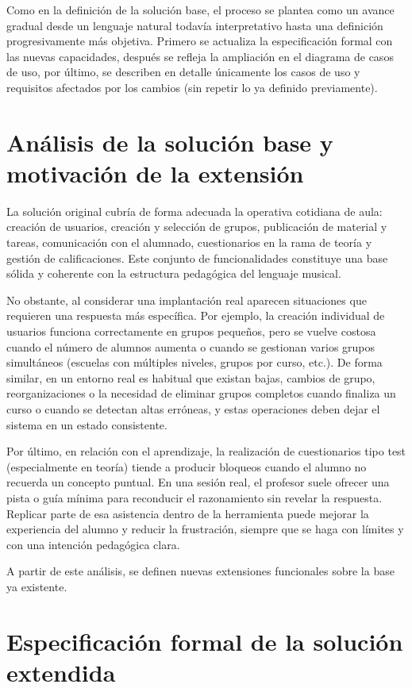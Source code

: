Como en la definición de la solución base, el proceso se plantea como un avance gradual desde un lenguaje natural todavía interpretativo hasta una definición progresivamente más objetiva. Primero se actualiza la especificación formal con las nuevas capacidades, después se refleja la ampliación en el diagrama de casos de uso, por último, se describen en detalle únicamente los casos de uso y requisitos afectados por los cambios (sin repetir lo ya definido previamente).
\newpage
\section{Análisis de la solución base y motivación de la extensión}
\label{sec:analisis_base}

La solución original cubría de forma adecuada la operativa cotidiana de aula: creación de usuarios, creación y selección de grupos, publicación de material y tareas, comunicación con el alumnado, cuestionarios en la rama de teoría y gestión de calificaciones. Este conjunto de funcionalidades constituye una base sólida y coherente con la estructura pedagógica del lenguaje musical.

No obstante, al considerar una implantación real aparecen situaciones que requieren una respuesta más específica. Por ejemplo, la creación individual de usuarios funciona correctamente en grupos pequeños, pero se vuelve costosa cuando el número de alumnos aumenta o cuando se gestionan varios grupos simultáneos (escuelas con múltiples niveles, grupos por curso, etc.). De forma similar, en un entorno real es habitual que existan bajas, cambios de grupo, reorganizaciones o la necesidad de eliminar grupos completos cuando finaliza un curso o cuando se detectan altas erróneas, y estas operaciones deben dejar el sistema en un estado consistente.

Por último, en relación con el aprendizaje, la realización de cuestionarios tipo test (especialmente en teoría) tiende a producir bloqueos cuando el alumno no recuerda un concepto puntual. En una sesión real, el profesor suele ofrecer una pista o guía mínima para reconducir el razonamiento sin revelar la respuesta. Replicar parte de esa asistencia dentro de la herramienta puede mejorar la experiencia del alumno y reducir la frustración, siempre que se haga con límites y con una intención pedagógica clara.

A partir de este análisis, se definen nuevas extensiones funcionales sobre la base ya existente.

\section{Especificación formal de la solución extendida}
\label{sec:especificacion_formal_extendida}

